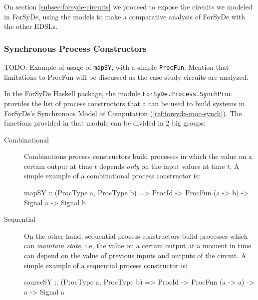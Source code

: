 \documentclass[a4paper]{article}
\begin{document}
                On section \ref{subsec:forsyde-circuits} we proceed to expose the circuits we
                modeled in ForSyDe, using the models to make a comparative analysis of ForSyDe with
                the other EDSLs.

            \subsubsection{Synchronous Process Constructors}
            \label{subsubsec:forsyde-synchprocs}
                TODO: Example of usage of \texttt{mapSY}, with a simple \texttt{ProcFun}. Mention
                that limitations to ProcFun will be discussed as the case study circuits are
                analyzed.

                In the ForSyDe Haskell package, the module \texttt{ForSyDe.Process.SynchProc}
                provides the list of process constructors that a can be used to build systems in
                ForSyDe's Synchronous Model of Computation (\ref{ref:forsyde-moc-synch}). The
                functions provided in that module can be divided in 2 big groups:

                \begin{description}
                    \item[Combinational] Combinations process constructors build processes in which
                        the value on a certain output at time $t$ depends \emph{only} on the input
                        values at time $t$. A simple example of a combinational process constructor
                        is:
                        \begin{haskellcode}
        mapSY :: (ProcType a, ProcType b) => ProcId
              -> ProcFun (a -> b) -> Signal a -> Signal b
                        \end{haskellcode}

                    \item[Sequential] On the other hand, sequential process constructors build
                        processes which can \emph{maintain state}, i.e, the value on a certain output
                        at a moment in time can depend on the value of previous inputs and outputs
                        of the circuit. A simple example of a sequential process constructor is:
                        \begin{haskellcode}
        sourceSY :: (ProcType a, ProcType b) => ProcId
                 -> ProcFun (a -> a) -> a -> Signal a
                        \end{haskellcode}

                \end{description}
\end{document}
